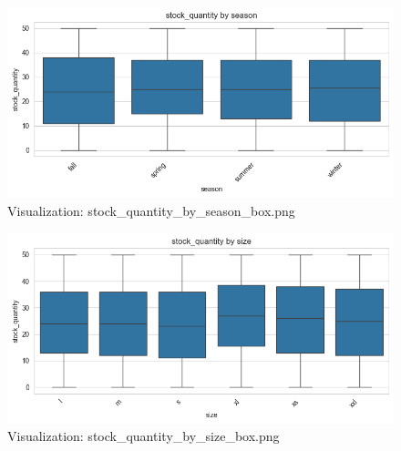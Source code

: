 \documentclass{article}%
\begin{document}
\begin{minipage}[c]{0.48\textwidth}%


\begin{figure}[H]%
\centering%
\includegraphics[width=\linewidth]{output/plots/stock_quantity_by_season_box.png}%
\caption{Visualization: stock\_quantity\_by\_season\_box.png}%
\end{figure}

%
\end{minipage}%
\begin{minipage}[c]{0.48\textwidth}%


\begin{figure}[H]%
\centering%
\includegraphics[width=\linewidth]{output/plots/stock_quantity_by_size_box.png}%
\caption{Visualization: stock\_quantity\_by\_size\_box.png}%
\end{figure}

%
\end{minipage}%
\vspace{10pt}%
\\%
\end{document}
